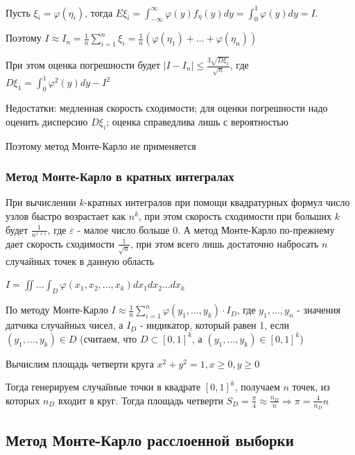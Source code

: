 \documentclass[12pt]{article}
\begin{document}
\begin{enumerate}[label*=\Roman*. ]
    Пусть $\xi_i = \varphi(\eta_i)$, тогда $E\xi_i = \int_{-\infty}^{\infty} \varphi(y) f_\eta (y) dy = \int_0^1 \varphi(y) dy = I$. 
    
    Поэтому $I \approx I_n = \frac{1}{n} \sum_{i = 1}^n \xi_i = \frac{1}{n} (\varphi(\eta_1) + \dots + \varphi(\eta_n))$

    При этом оценка погрешности будет $|I - I_n| \leq \frac{3\sqrt{D \xi_1}}{\sqrt{n}}$, где $D \xi_1 = \int_0^1 \varphi^2(y) dy - I^2$

    Недостатки: медленная скорость сходимости; для оценки погрешности надо оценить дисперсию $D\xi_i$; оценка справедлива лишь с вероятностью

    Поэтому метод Монте-Карло не применяется

\end{enumerate}

\subsubsection{Метод Монте-Карло в кратных интегралах}

\hypertarget{monte_carlo_k_integral}{}

\Nota При вычислении $k$-кратных интегралов при помощи квадратурных формул число узлов быстро возрастает как $n^k$, при этом скорость сходимости при больших $k$ будет $\frac{1}{n^{1 + \varepsilon}}$, где $\varepsilon$ - малое число больше 0. А метод Монте-Карло по-прежнему дает скорость сходимости $\frac{1}{\sqrt{n}}$, при этом всего лишь достаточно набросать $n$ случайных точек в данную область

$I = \iint \dots \int_D \varphi(x_1, x_2, \dots, x_k) dx_1 dx_2 \dots dx_k$

По методу Монте-Карло $I \approx \frac{1}{n} \sum_{i = 1}^n \varphi(y_1, \dots, y_k) \cdot I_D$, где $y_1, \dots, y_n$ - значения датчика случайных чисел, а $I_D$ - индикатор, который равен 1, если $(y_1, \dots, y_k) \in D$ (считаем, что $D \subset [0, 1]^k$, а $(y_1, \dots, y_k) \in [0, 1]^k$) 

\Ex Вычислим площадь четверти круга $x^2 + y^2 = 1, x \geq 0, y \geq 0$

Тогда генерируем случайные точки в квадрате $[0, 1]^k$, получаем $n$ точек, из которых $n_D$ входит в круг. Тогда площадь четверти $S_D = \frac{\pi}{4} \approx \frac{n_D}{n} \Longrightarrow \pi = \frac{4}{n_D}{n}$

\subsection{Метод Монте-Карло расслоенной выборки}
\end{document}
